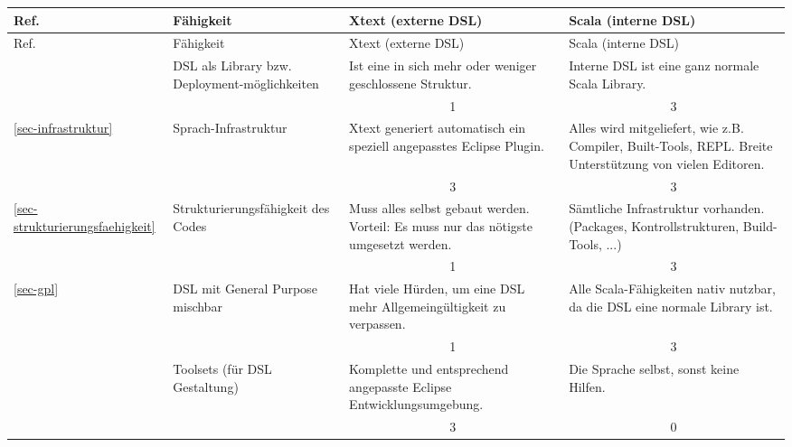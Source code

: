 \begin{landscape}
\begin{longtable}{|p{0.8cm}|p{4.4cm}|p{6.4cm}|p{6.4cm}|}

  \hline
  Ref. & Fähigkeit & Xtext (externe DSL) & Scala (interne DSL) \\ \hline \hline
  \endfirsthead

  \hline
  Ref. & Fähigkeit & Xtext (externe DSL) & Scala (interne DSL) \\ \hline
  \endhead

  & DSL als Library bzw. Deployment-möglichkeiten
  & Ist eine in sich mehr oder weniger geschlossene Struktur.
  & Interne DSL ist eine ganz normale Scala Library.
  \\
  \cline{3-4}
  & & \multicolumn{1}{c|}{ 1 } & \multicolumn{1}{c|}{ 3 } \\ \hline

  \ref{sec-infrastruktur}
  & Sprach-Infrastruktur
  & Xtext generiert automatisch ein speziell angepasstes Eclipse Plugin.
  & Alles wird mitgeliefert, wie z.B. Compiler, Built-Tools, REPL.
    Breite Unterstützung von vielen Editoren.
  \\
  \cline{3-4}
  & & \multicolumn{1}{c|}{ 3 } & \multicolumn{1}{c|}{ 3 } \\ \hline

  \ref{sec-strukturierungsfaehigkeit}
  & Strukturierungsfähigkeit des Codes
  & Muss alles selbst gebaut werden. Vorteil: Es muss nur das nötigste
    umgesetzt werden.
  & Sämtliche Infrastruktur vorhanden. (Packages, Kontrollstrukturen,
    Build-Tools, ...)
  \\
  \cline{3-4}
  & & \multicolumn{1}{c|}{ 1 } & \multicolumn{1}{c|}{ 3 } \\ \hline

  \ref{sec-gpl}
  & DSL mit General Purpose mischbar
  & Hat viele Hürden, um eine DSL mehr Allgemeingültigkeit zu verpassen.
  & Alle Scala-Fähigkeiten nativ nutzbar, da die DSL eine normale Library ist.
  \\
  \cline{3-4}
  & & \multicolumn{1}{c|}{ 1 } & \multicolumn{1}{c|}{ 3 } \\ \hline

  & Toolsets (für DSL Gestaltung)
  & Komplette und entsprechend angepasste Eclipse Entwicklungsumgebung.
  & Die Sprache selbst, sonst keine Hilfen.
  \\
  \cline{3-4}
  & & \multicolumn{1}{c|}{ 3 } & \multicolumn{1}{c|}{ 0 } \\ \hline


\end{longtable}
\end{landscape}
